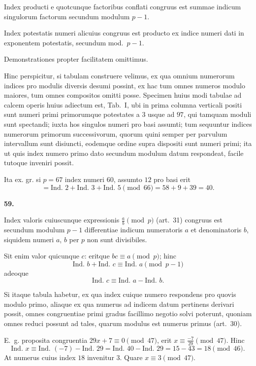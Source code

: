 \documentclass[12pt,a4paper]{article}
\theoremstyle{plain}
\theoremstyle{definition}
\theoremstyle{remark}
\begin{document}
Index producti e quotcunque factoribus conflati congruus est summae indicum singulorum factorum secundum modulum $p-1$.

Index potestatis numeri alicuius congruus est producto ex indice numeri dati in exponentem potestatis, secundum mod.~$p-1$.

Demonstrationes propter facilitatem omittimus.

Hinc perspicitur, si tabulam construere velimus, ex qua omnium numerorum indices pro modulis diversis desumi possint, ex hac tum omnes numeros modulo maiores, tum omnes compositos omitti posse. Specimen huius modi tabulae ad calcem operis huius adiectum est, Tab.~I, ubi in prima columna verticali positi sunt numeri primi primorumque potestates a $3$ usque ad $97$, qui tamquam moduli sunt spectandi; iuxta hos singulos numeri pro basi assumti; tum sequuntur indices numerorum primorum successivorum, quorum quini semper per parvulum intervallum sunt disiuncti, eodemque ordine supra dispositi sunt numeri primi; ita ut quis index numero primo dato secundum modulum datum respondeat, facile tutoque inveniri possit.

Ita ex. gr. si $p=67$ index numeri $60$, assumto $12$ pro basi erit
\[= \text{Ind. } 2 + \text{Ind. } 3 + \text{Ind. } 5 \pmod{66} = 58 + 9 + 39 = 40.\]

\setcounter{satz}{59}
\addtocounter{satz}{-1}
\textbf{59.}

Index valoris cuiuscunque expressionis $\frac{a}{b} \pmod{p}$ (art.~31) congruus est secundum modulum $p-1$ differentiae indicum numeratoris $a$ et denominatoris $b$, siquidem numeri $a$, $b$ per $p$ non sunt divisibiles.

Sit enim valor quicunque $c$: eritque $bc \equiv a \pmod{p}$; hinc
\[\text{Ind. } b + \text{Ind. } c \equiv \text{Ind. } a \pmod{p-1}\]
adeoque
\[\text{Ind. } c \equiv \text{Ind. } a - \text{Ind. } b.\]

Si itaque tabula habetur, ex qua index cuique numero respondens pro quovis modulo primo, aliaque ex qua numerus ad indicem datum pertinens derivari possit, omnes congruentiae primi gradus facillimo negotio solvi poterunt, quoniam omnes reduci possunt ad tales, quarum modulus est numerus primus (art.~30).

E.~g. proposita congruentia $29x + 7 \equiv 0 \pmod{47}$, erit $x \equiv \frac{-7}{29} \pmod{47}$. Hinc
\[\text{Ind. } x \equiv \text{Ind. }(-7) - \text{Ind. } 29 = \text{Ind. } 40 - \text{Ind. } 29 = 15 - 43 = 18 \pmod{46}.\]
At numerus cuius index $18$ invenitur $3$. Quare $x \equiv 3 \pmod{47}$.
\end{document}
